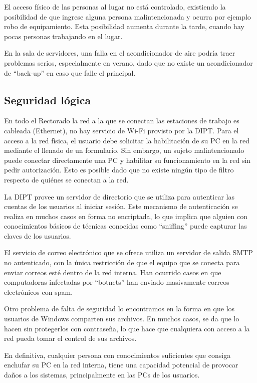\documentclass[a4paper,11pt,oneside]{article}
\begin{document}
El acceso físico de las personas al lugar no está controlado, existiendo la
posibilidad de que ingrese alguna persona malintencionada y ocurra por
ejemplo robo de equipamiento. Esta posibilidad aumenta durante la
tarde, cuando hay pocas personas trabajando en el lugar.


En la sala de servidores, una falla en el acondicionador de aire
podría traer problemas serios, especialmente en verano, dado que no
existe un acondicionador de ``back-up'' en caso que falle el
principal.


%
\subsection*{Seguridad lógica}
En todo el Rectorado la red a la que se conectan las estaciones de
trabajo es cableada (Ethernet), no hay servicio de Wi-Fi provisto por
la DIPT. Para el acceso a la red física, el usuario debe solicitar la
habilitación de su PC en la red mediante el llenado de un
formulario. Sin embargo, un sujeto malintencionado puede conectar
directamente una PC y habilitar su funcionamiento en la red sin pedir
autorización. Esto es posible dado que no existe ningún tipo de filtro
respecto de quiénes se conectan a la red.

La DIPT provee un servidor de directorio  que se utiliza
para autenticar las cuentas de los usuarios al iniciar sesión. Este
mecanismo de autenticación se realiza en muchos casos en forma no
encriptada, lo que implica que alguien con conocimientos básicos de
técnicas conocidas como ``sniffing'' puede capturar las claves de los
usuarios.

El servicio de correo electrónico que se ofrece utiliza un servidor de
salida SMTP no autenticado, con la única restricción de que el equipo
que se conecta para enviar correos esté dentro de la red interna. Han
ocurrido casos en que computadoras infectadas por ``botnets'' han
enviado masivamente correos electrónicos con spam.

Otro problema de falta de seguridad lo encontramos en la forma en que
los usuarios de Windows comparten sus archivos. En muchos casos, se da
que lo hacen sin protegerlos con contraseña, lo que hace que
cualquiera con acceso a la red pueda tomar el control de sus archivos.

En definitiva, cualquier persona con conocimientos suficientes que
consiga enchufar su PC en la red interna, tiene una capacidad
potencial de provocar daños a los sistemas, principalmente en las PCs
de los usuarios.
%
\end{document}
